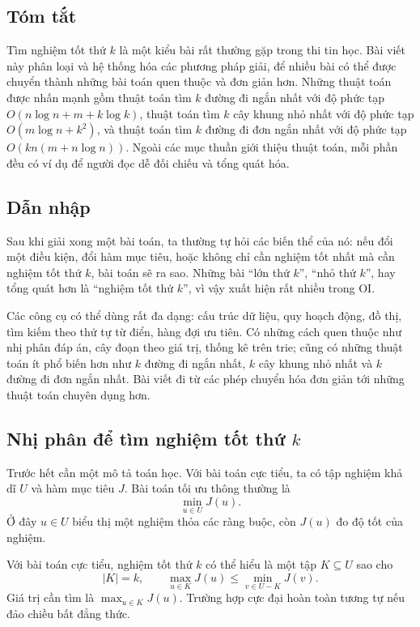 \documentclass[11pt]{article}
\begin{document}
\subsection*{Tóm tắt}

Tìm nghiệm tốt thứ \(k\) là một kiểu bài rất thường gặp trong thi tin học. Bài
viết này phân loại và hệ thống hóa các phương pháp giải, để nhiều bài có thể
được chuyển thành những bài toán quen thuộc và đơn giản hơn. Những thuật toán
được nhấn mạnh gồm thuật toán tìm \(k\) đường đi ngắn nhất với độ phức tạp
\(O(n\log n+m+k\log k)\), thuật toán tìm \(k\) cây khung nhỏ nhất với độ phức
tạp \(O(m\log n+k^2)\), và thuật toán tìm \(k\) đường đi đơn ngắn nhất với độ
phức tạp \(O(kn(m+n\log n))\). Ngoài các mục thuần giới thiệu thuật toán, mỗi
phần đều có ví dụ để người đọc dễ đối chiếu và tổng quát hóa.

\subsection{Dẫn nhập}

Sau khi giải xong một bài toán, ta thường tự hỏi các biến thể của nó: nếu đổi
một điều kiện, đổi hàm mục tiêu, hoặc không chỉ cần nghiệm tốt nhất mà cần nghiệm
tốt thứ \(k\), bài toán sẽ ra sao. Những bài ``lớn thứ \(k\)'', ``nhỏ thứ
\(k\)'', hay tổng quát hơn là ``nghiệm tốt thứ \(k\)'', vì vậy xuất hiện rất
nhiều trong OI.

Các công cụ có thể dùng rất đa dạng: cấu trúc dữ liệu, quy hoạch động, đồ thị,
tìm kiếm theo thứ tự từ điển, hàng đợi ưu tiên. Có những cách quen thuộc như
nhị phân đáp án, cây đoạn theo giá trị, thống kê trên trie; cũng có những thuật
toán ít phổ biến hơn như \(k\) đường đi ngắn nhất, \(k\) cây khung nhỏ nhất và
\(k\) đường đi đơn ngắn nhất. Bài viết đi từ các phép chuyển hóa đơn giản tới
những thuật toán chuyên dụng hơn.

\subsection{Nhị phân để tìm nghiệm tốt thứ \texorpdfstring{\(k\)}{k}}

Trước hết cần một mô tả toán học. Với bài toán cực tiểu, ta có tập nghiệm khả
dĩ \(U\) và hàm mục tiêu \(J\). Bài toán tối ưu thông thường là
\[
  \min_{u\in U} J(u).
\]
Ở đây \(u\in U\) biểu thị một nghiệm thỏa các ràng buộc, còn \(J(u)\) đo độ tốt
của nghiệm.

Với bài toán cực tiểu, nghiệm tốt thứ \(k\) có thể hiểu là một tập \(K\subseteq
U\) sao cho
\[
  |K|=k,\qquad
  \max_{u\in K} J(u) \le \min_{v\in U-K} J(v).
\]
Giá trị cần tìm là \(\max_{u\in K}J(u)\). Trường hợp cực đại hoàn toàn tương
tự nếu đảo chiều bất đẳng thức.
\end{document}
